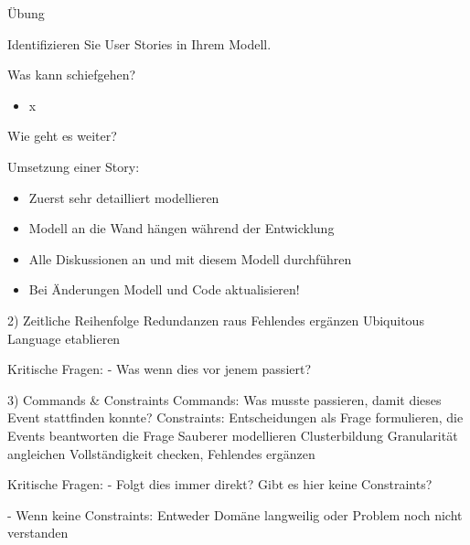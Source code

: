 \begin{frame}[fragile]{Übung}

Identifizieren Sie User Stories in Ihrem Modell.

\end{frame}

\begin{frame}[fragile]{Was kann schiefgehen?}

\begin{itemize}
\item x
\end{itemize}

\end{frame}


\begin{frame}[fragile]{Wie geht es weiter?}

Umsetzung einer Story:

\begin{itemize}
\item Zuerst sehr detailliert modellieren
\item Modell an die Wand hängen während der Entwicklung
\item Alle Diskussionen an und mit diesem Modell durchführen
\item Bei Änderungen Modell und Code aktualisieren!
\end{itemize}

\end{frame}







2) Zeitliche Reihenfolge
Redundanzen raus
Fehlendes ergänzen
Ubiquitous Language etablieren

Kritische Fragen:
- Was wenn dies vor jenem passiert?

3) Commands \& Constraints
Commands: Was musste passieren, damit dieses Event stattfinden konnte?
Constraints: Entscheidungen als Frage formulieren, die Events beantworten die Frage
Sauberer modellieren
Clusterbildung
Granularität angleichen
Vollständigkeit checken, Fehlendes ergänzen

Kritische Fragen:
- Folgt dies immer direkt? Gibt es hier keine Constraints?

- Wenn keine Constraints: Entweder Domäne langweilig oder Problem noch nicht verstanden

